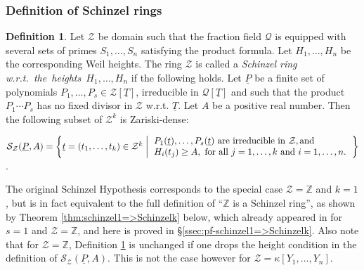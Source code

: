 \documentclass[11pt,a4paper,reqno]{amsart}
\theoremstyle{definition}
\newtheorem{defn}[thm]{Definition}
\begin{document}

\subsubsection{Definition of Schinzel rings}

\begin{defn} \label{def:schinzel} 
Let ${\mathcal Z}$ be domain such that the fraction field ${\mathcal Q}$ is equipped with several sets of primes $S_1,\ldots,S_n$ satisfying the product formula. Let $H_1,\ldots,H_n$ be the corresponding Weil heights. The ring  ${\mathcal Z}$ is called a \emph{Schinzel ring \hbox{w.r.t. the heights $H_1,\ldots,H_n$}} if the following holds. Let $\underline P$ be a finite set of polynomials $P_1,\ldots,P_s \in {\mathcal Z}[\underline T]$,  irreducible in $\mathcal{Q}[\underline T]$
and such that the product $P_1\cdots P_s$ has no fixed divisor in ${\mathcal Z}$ \hbox{w.r.t.} $\underline T$.
Let $A$ be a positive real number. Then the following subset of ${\mathcal Z}^k$ is Zariski-dense:
\vskip 1mm

\centerline{\hskip 6mm ${\mathcal S}_{\mathcal{Z}}(\underline P,A)
= \left\{\underline t = (t_1,\ldots,t_k)\in {\mathcal Z}^k \hskip 1pt \left\vert\hskip 1pt \begin{array}{c}
     P_1(\underline t), \ldots, P_s(\underline t) \ \hbox{\rm are irreducible in ${\mathcal Z}$}, \hbox{and} \hfill \hfill \\
     H_i(t_j) \geq A,\ \hbox{for all } j=1,\ldots,k \ \hbox{and}\  i=1,\ldots,n. \hfill \hfill \\
    \end{array}\right. \right\} 
    $.}
\end{defn}

The original Schinzel Hypothesis corresponds to the special case ${\mathcal Z}={\mathbb Z}$ and $k=1$, but is in fact equivalent to the full definition of ``${\mathbb Z}$ is a Schinzel ring'', as shown by Theorem \ref{thm:schinzel1=>Schinzelk} below, which already appeared in \cite[Lemma 2.3]{KK25} for $s=1$ and ${\mathcal Z}={\mathbb Z}$, and here is proved in \S \ref{ssec:pf-schinzel1=>Schinzelk}.
Also note that for ${\mathcal Z}={\mathbb Z}$, Definition \ref{def:schinzel} is unchanged if one drops the height condition in the definition of ${\mathcal S}_{\mathcal{Z}}(\underline P,A)$. This is not the case however for ${\mathcal Z} = \kappa[Y_1,\ldots,Y_n]$.
 
\end{document}

